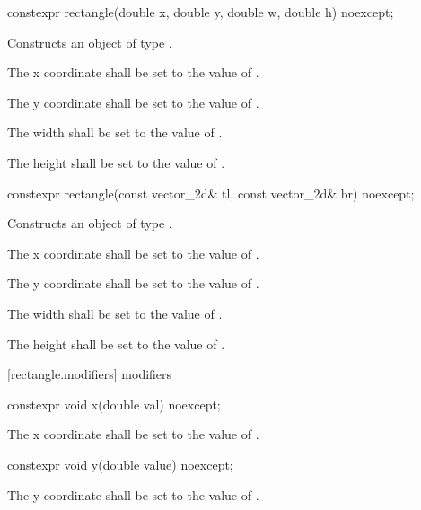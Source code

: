 \begin{itemdecl}
constexpr rectangle(double x, double y, double w, double h) noexcept;
\end{itemdecl}
\begin{itemdescr}
\pnum
\effects
Constructs an object of type .

\pnum
The x coordinate shall be set to the value of .

\pnum
The y coordinate shall be set to the value of .

\pnum
The width shall be set to the value of .

\pnum
The height shall be set to the value of .
\end{itemdescr}

\begin{itemdecl}
constexpr rectangle(const vector_2d& tl, const vector_2d& br) noexcept;
\end{itemdecl}
\begin{itemdescr}
\pnum
\effects
Constructs an object of type .

\pnum
The x coordinate shall be set to the value of .

\pnum
The y coordinate shall be set to the value of .

\pnum
The width shall be set to the value of .

\pnum
The height shall be set to the value of .
\end{itemdescr}

 [rectangle.modifiers]{ modifiers}

\begin{itemdecl}
constexpr void x(double val) noexcept;
\end{itemdecl}

\begin{itemdescr}
\pnum
\effects
The x coordinate shall be set to the value of .
\end{itemdescr}

\begin{itemdecl}
constexpr void y(double value) noexcept;
\end{itemdecl}
\begin{itemdescr}
\pnum
\effects
The y coordinate shall be set to the value of .
\end{itemdescr}

